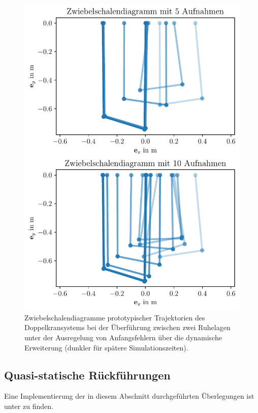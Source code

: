 \begin{figure}[H]
	\begin{center}
		\includegraphics[scale=1]{Pictures/onion_skinned_dynamic}
	\end{center}
	\caption[Zwiebelschalendiagramm Ruhelagenüberführung mit Regelung über dynamische Erweiterung]
	{Zwiebelschalendiagramme prototypischer Trajektorien des Doppelkransystems bei der Überführung zwischen zwei Ruhelagen unter der Ausregelung von Anfangsfehlern über die dynamische Erweiterung (dunkler für spätere Simulationszeiten).}
	\label{onion_skinned_dyn_controller_initial_error}
\end{figure}

\subsection{Quasi-statische Rückführungen}
\label{sec:quasi_static_control}
Eine Implementierung der in diesem Abschnitt durchgeführten Überlegungen ist unter \cite[flatness\_notebooks/ODE\_flatness\_trajectory\_control\_simulation\_qstat.ipynb]{SAGithub} zu finden.

